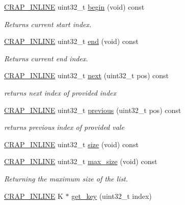 \begin{DoxyCompactItemize}
\hyperlink{config__x86_8h_a5a40526b8d842e7ff731509998bb0f1c}{C\+R\+A\+P\+\_\+\+I\+N\+L\+I\+N\+E} uint32\+\_\+t \hyperlink{classcrap_1_1array__map_a631a78152d8e716195702f77b8dc3933}{begin} (void) const 
\begin{DoxyCompactList}\small\item\em Returns current start index. \end{DoxyCompactList}\item 
\hyperlink{config__x86_8h_a5a40526b8d842e7ff731509998bb0f1c}{C\+R\+A\+P\+\_\+\+I\+N\+L\+I\+N\+E} uint32\+\_\+t \hyperlink{classcrap_1_1array__map_a264c73b4b30631bcd6818e8004c5f69e}{end} (void) const 
\begin{DoxyCompactList}\small\item\em Returns current end index. \end{DoxyCompactList}\item 
\hyperlink{config__x86_8h_a5a40526b8d842e7ff731509998bb0f1c}{C\+R\+A\+P\+\_\+\+I\+N\+L\+I\+N\+E} uint32\+\_\+t \hyperlink{classcrap_1_1array__map_afa487961a9f3d61f7c759954298f3fe4}{next} (uint32\+\_\+t pos) const 
\begin{DoxyCompactList}\small\item\em returns next index of provided index \end{DoxyCompactList}\item 
\hyperlink{config__x86_8h_a5a40526b8d842e7ff731509998bb0f1c}{C\+R\+A\+P\+\_\+\+I\+N\+L\+I\+N\+E} uint32\+\_\+t \hyperlink{classcrap_1_1array__map_a4f417df221bbab8fe116d792d2b5d039}{previous} (uint32\+\_\+t pos) const 
\begin{DoxyCompactList}\small\item\em returns previous index of provided vale \end{DoxyCompactList}\item 
\hyperlink{config__x86_8h_a5a40526b8d842e7ff731509998bb0f1c}{C\+R\+A\+P\+\_\+\+I\+N\+L\+I\+N\+E} uint32\+\_\+t \hyperlink{classcrap_1_1array__map_a3cabf7c30b1e7d29a8d0e4addbcf6f11}{size} (void) const 
\item 
\hyperlink{config__x86_8h_a5a40526b8d842e7ff731509998bb0f1c}{C\+R\+A\+P\+\_\+\+I\+N\+L\+I\+N\+E} uint32\+\_\+t \hyperlink{classcrap_1_1array__map_afc44d600189d7d77d3b310892d37340c}{max\+\_\+size} (void) const 
\begin{DoxyCompactList}\small\item\em Returning the maximum size of the list. \end{DoxyCompactList}\item 
\hyperlink{config__x86_8h_a5a40526b8d842e7ff731509998bb0f1c}{C\+R\+A\+P\+\_\+\+I\+N\+L\+I\+N\+E} K $\ast$ \hyperlink{classcrap_1_1array__map_a2e4b30cdbbe65343a212fa7c80519393}{get\+\_\+key} (uint32\+\_\+t index)

\end{DoxyCompactItemize}
